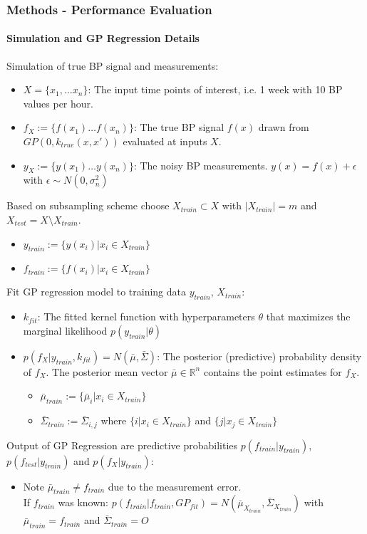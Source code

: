 \documentclass[
	8pt, %
]{beamer}
\begin{document}
\begin{frame}
	\frametitle{Methods - Performance Evaluation}
	\framesubtitle{Simulation and GP Regression Details}
	Simulation of true BP signal and measurements:
		\begin{itemize}
			\item $X=\{x_1, \dots x_n\}$: The input time points of interest, i.e. 1 week with 10 BP values per hour.
			\item $f_X := \{f(x_1) \dots f(x_n)\}$: The true BP signal $f(x)$ drawn from $GP(0, k_{true}(x,x'))$ evaluated at inputs $X$.
			\item $y_X := \{y(x_1) \dots y(x_n)\}$: The noisy BP measurements. $y(x)= f(x) + \epsilon$ with $\epsilon \sim N(0, \sigma_n^2)$
		\end{itemize}
	\bigskip
	Based on subsampling scheme choose $X_{train} \subset X$ with $|X_{train}| = m$ and $X_{test} = X \setminus X_{train}$.
	\begin{itemize}
		\item $y_{train} := \{y(x_i) | x_i \in X_{train}\}$
		\item  $f_{train} := \{f(x_i) | x_i \in X_{train}\}$
	\end{itemize}

	\bigskip

	Fit GP regression model to training data $y_{train}$, $X_{train}$:
			\begin{itemize}
				\item $k_{fit}$: The fitted kernel function with hyperparameters $\theta$ that maximizes the marginal likelihood
				$p(y_{train}| \theta)$
				\item $p(f_X| y_{train}, k_{fit}) = N(\bar{\mu}, \bar{\Sigma})$:
				The posterior (predictive) probability density of $f_X$. The posterior mean vector
				$\bar{\mu} \in \mathbb{R}^n$ contains the point estimates for $f_X$.
				\begin{itemize}
					\item $\bar{\mu}_{train} := \{\bar{\mu}_i | x_i \in X_{train}\}$
					\item $\bar{\Sigma}_{train} := \bar{\Sigma}_{i,j}$ where $\{i | x_i \in X_{train}\}$ and $\{j | x_j \in X_{train}\}$

				\end{itemize}
			\end{itemize}
	\bigskip
	Output of GP Regression are predictive probabilities $p(f_{train}| y_{train})$,
		$p(f_{test}| y_{train})$ and $p(f_{X}| y_{train})$:
			\begin{itemize}
				\item Note $\bar{\mu}_{train} \neq f_{train}$ due to the measurement error. \\ If
				$f_{train}$ was known: $p(f_{train}| f_{train}, GP_{fit}) = N(\bar{\mu}_{X_{train}},
				\bar{\Sigma}_{X_{train}})$
				with $\bar{\mu}_{train} = f_{train}$ and $\bar{\Sigma}_{train} = {\displaystyle O}$
			\end{itemize}

\end{frame}
\end{document}
